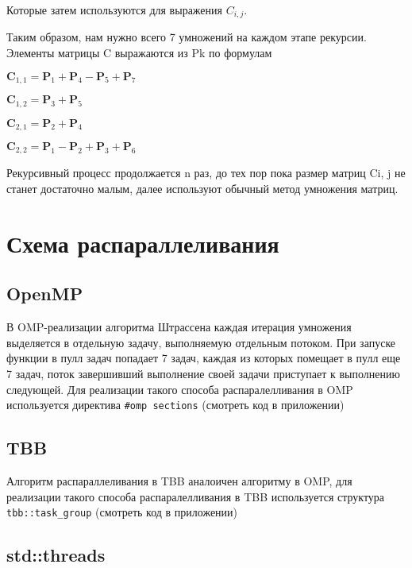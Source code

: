 \documentclass{report}
\begin{document}
\par Которые затем используются для выражения ${{C} _{i ,j}}$. 
\par Таким образом, нам нужно всего 7 умножений на каждом этапе рекурсии. Элементы матрицы C выражаются из Pk по формулам

\par ${\displaystyle \mathbf {C} _{1,1}=\mathbf {P} _{1}+\mathbf {P} _{4}-\mathbf {P} _{5}+\mathbf {P} _{7}}$
\par ${\displaystyle \mathbf {C} _{1,2}=\mathbf {P} _{3}+\mathbf {P} _{5}}$
\par ${\displaystyle \mathbf {C} _{2,1}=\mathbf {P} _{2}+\mathbf {P} _{4}}$
\par ${\displaystyle \mathbf {C} _{2,2}=\mathbf {P} _{1}-\mathbf {P} _{2}+\mathbf {P} _{3}+\mathbf {P} _{6}}$
\par Рекурсивный процесс продолжается n раз, до тех пор пока размер матриц Ci, j не станет достаточно малым, далее используют обычный метод умножения матриц.

\newpage

\section*{Схема распараллеливания}
\subsection*{OpenMP}
\par В OMP-реализации алгоритма Штрассена каждая итерация умножения выделяется в отдельную задачу, выполняемую отдельным потоком. При запуске функции в пулл задач попадает 7 задач, каждая из которых помещает в пулл еще 7 задач, поток завершивший выполнение своей задачи приступает к выполнению следующей. Для реализации такого способа распаралелливания в OMP используется директива \verb|#omp sections| (смотреть код в приложении)

\subsection*{TBB}

\par Алгоритм распараллеливания в TBB аналоичен алгоритму в OMP, для реализации такого способа распаралелливания в TBB используется структура \verb|tbb::task_group| (смотреть код в приложении)

\subsection*{std::threads}
\end{document}
